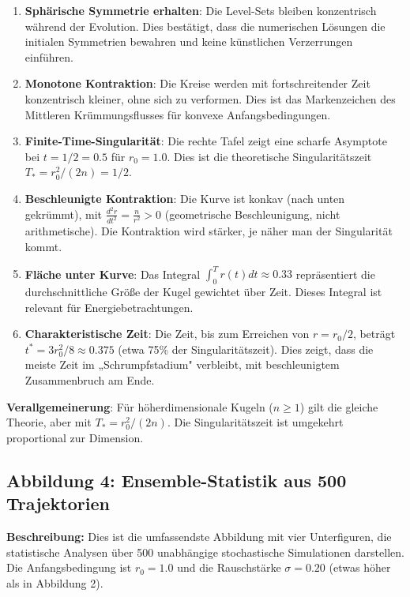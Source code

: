\documentclass[a4paper,12pt]{article}
\theoremstyle{definition}
\begin{document}
\begin{enumerate}
	\item \textbf{Sphärische Symmetrie erhalten}: Die Level-Sets bleiben konzentrisch während der Evolution. Dies bestätigt, dass die numerischen Lösungen die initialen Symmetrien bewahren und keine künstlichen Verzerrungen einführen.
	
	\item \textbf{Monotone Kontraktion}: Die Kreise werden mit fortschreitender Zeit konzentrisch kleiner, ohne sich zu verformen. Dies ist das Markenzeichen des Mittleren Krümmungsflusses für konvexe Anfangsbedingungen.
	
	\item \textbf{Finite-Time-Singularität}: Die rechte Tafel zeigt eine scharfe Asymptote bei $t = 1/2 = 0.5$ für $r_0 = 1.0$. Dies ist die theoretische Singularitätszeit $T_* = r_0^2 / (2n) = 1 / 2$.
	
	\item \textbf{Beschleunigte Kontraktion}: Die Kurve ist konkav (nach unten gekrümmt), mit $\frac{d^2r}{dt^2} = \frac{n}{r^2} > 0$ (geometrische Beschleunigung, nicht arithmetische). Die Kontraktion wird stärker, je näher man der Singularität kommt.
	
	\item \textbf{Fläche unter Kurve}: Das Integral $\int_0^T r(t) dt \approx 0.33$ repräsentiert die durchschnittliche Größe der Kugel gewichtet über Zeit. Dieses Integral ist relevant für Energiebetrachtungen.
	
	\item \textbf{Charakteristische Zeit}: Die Zeit, bis zum Erreichen von $r = r_0/2$, beträgt $t^* = 3r_0^2/8 \approx 0.375$ (etwa 75\% der Singularitätszeit). Dies zeigt, dass die meiste Zeit im „Schrumpfstadium" verbleibt, mit beschleunigtem Zusammenbruch am Ende.
\end{enumerate}

\textbf{Verallgemeinerung}: Für höherdimensionale Kugeln ($n \geq 1$) gilt die gleiche Theorie, aber mit $T_* = r_0^2 / (2n)$. Die Singularitätszeit ist umgekehrt proportional zur Dimension.

\subsection{Abbildung 4: Ensemble-Statistik aus 500 Trajektorien}

\textbf{Beschreibung:} Dies ist die umfassendste Abbildung mit vier Unterfiguren, die statistische Analysen über 500 unabhängige stochastische Simulationen darstellen. Die Anfangsbedingung ist $r_0 = 1.0$ und die Rauschstärke $\sigma = 0.20$ (etwas höher als in Abbildung 2).
\end{document}
